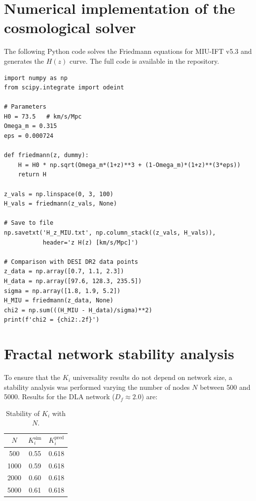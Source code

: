 \documentclass[12pt, a4paper]{article}
\theoremstyle{miuThm}
\theoremstyle{remark}
\begin{document}
\clearpage
\section{Numerical implementation of the cosmological solver}

The following Python code solves the Friedmann equations for MIU-IFT v5.3 and generates the $H(z)$ curve. The full code is available in the repository.

\begin{verbatim}
import numpy as np
from scipy.integrate import odeint

# Parameters
H0 = 73.5   # km/s/Mpc
Omega_m = 0.315
eps = 0.000724

def friedmann(z, dummy):
    H = H0 * np.sqrt(Omega_m*(1+z)**3 + (1-Omega_m)*(1+z)**(3*eps))
    return H

z_vals = np.linspace(0, 3, 100)
H_vals = friedmann(z_vals, None)

# Save to file
np.savetxt('H_z_MIU.txt', np.column_stack((z_vals, H_vals)), 
           header='z H(z) [km/s/Mpc]')

# Comparison with DESI DR2 data points
z_data = np.array([0.7, 1.1, 2.3])
H_data = np.array([97.6, 128.3, 235.5])
sigma = np.array([1.8, 1.9, 5.2])
H_MIU = friedmann(z_data, None)
chi2 = np.sum(((H_MIU - H_data)/sigma)**2)
print(f'chi2 = {chi2:.2f}')
\end{verbatim}

\clearpage
\section{Fractal network stability analysis}

To ensure that the $K_i$ universality results do not depend on network size, a stability analysis was performed varying the number of nodes $N$ between 500 and 5000. Results for the DLA network ($D_f\approx2.0$) are:

\begin{table}[h!]
\centering
\caption{Stability of $K_i$ with $N$.}
\label{tab:estabilidad}
\begin{tabular}{ccc}
\toprule
$N$ & $K_i^{\text{sim}}$ & $K_i^{\text{pred}}$ \\
\midrule
500 & 0.55 & 0.618 \\
1000 & 0.59 & 0.618 \\
2000 & 0.60 & 0.618 \\
5000 & 0.61 & 0.618 \\
\bottomrule
\end{tabular}
\end{table}
\end{document}
